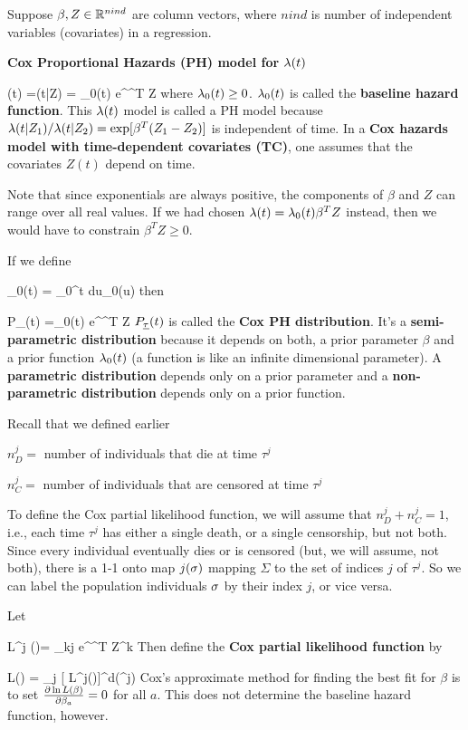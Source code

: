 Suppose $\beta, Z\in { \mathbb{R}}^{nind}$ are
column vectors, where $nind$ is
number of independent variables (covariates)
in a regression.

{\bf Cox Proportional Hazards (PH) model for
$\lambda(t)$}

\beq
\lam(t) =\lam(t|Z) = \lam_0(t) e^{\beta^T Z}
\eeq
where $\lambda_0(t)\geq 0$.
$\lambda_0(t)$
is called the {\bf baseline
hazard function}.
This $\lambda(t)$  model is called a
PH model because
$\lambda(t|Z_1)/\lambda(t|Z_2)=
\exp[\beta^T(Z_1-Z_2)]$
is independent of time.
In a {\bf Cox hazards model with time-dependent covariates (TC)},
one assumes that the covariates
$Z(t)$ depend on time.

Note that since exponentials
are always positive, the components
of $\beta$ and $Z$ can
range over all real values.
If we had chosen
$\lambda(t) = \lambda_0(t)\beta^T Z$
instead, then we would have
to constrain $\beta^TZ\geq 0$.

If we define

\beq
\Lambda_0(t) = \int_0^t du\;\lam_0(u)
\eeq
then

\beq
P_\rvtau(t) =\lam_0(t) e^{\beta^T Z} 
\eeq
$P_{\underline{\tau}}(t)$ is called the {\bf Cox PH distribution}.
It's a {\bf semi-parametric distribution}
because it depends on both, a prior
parameter $\beta$ and a prior function $\lambda_0(t)$
(a function is like an infinite dimensional parameter).
A {\bf parametric  distribution}
depends only on a prior parameter and
a {\bf non-parametric  distribution}
depends only on a prior function.

Recall that we defined earlier

$n_D^j=$ number of individuals
that die  at time $\tau^j$


$n_C^j=$ number of individuals
that are censored at time $\tau^j$


To define the Cox partial likelihood function,
we will assume that $n^j_D + n^j_C =1$, i.e.,
each time $\tau^j$ has either
a single death, or a single censorship, but not both.
Since every individual
eventually dies or is censored (but, we will assume, not both),
there is a 1-1 onto map $j(\sigma)$ mapping $\Sigma$ to the set
of indices $j$ of $\tau^j$. So we can label the population individuals
$\sigma$ by
their index $j$, or vice versa.

Let

\beq
 L^j (\beta)=
{\sum_{k\geq j} e^{\beta^T Z^{k}}}
\eeq
Then define the {\bf Cox partial likelihood function} by


\beq
 L(\beta) = \prod_j [ L^j(\beta)]^{{d(\tau^j})}
\eeq
Cox's approximate method for finding
the best fit for $\beta$
is to set $
\frac{\partial\ln  L(\beta)}{\partial\beta_a} =0$
for all $a$. This does not determine the
baseline hazard function, however.

